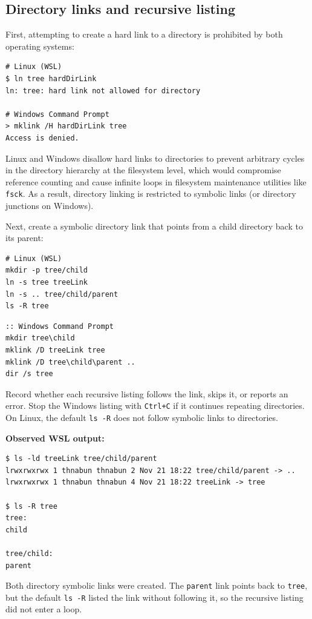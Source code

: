 \documentclass[a4paper,11pt]{article}
\begin{document}
\subsection{Directory links and recursive listing}
First, attempting to create a hard link to a directory is prohibited by both operating systems:
\begin{lstlisting}
# Linux (WSL)
$ ln tree hardDirLink
ln: tree: hard link not allowed for directory

# Windows Command Prompt
> mklink /H hardDirLink tree
Access is denied.
\end{lstlisting}
Linux and Windows disallow hard links to directories to prevent arbitrary cycles in the directory hierarchy at the filesystem level, which would compromise reference counting and cause infinite loops in filesystem maintenance utilities like \texttt{fsck}. As a result, directory linking is restricted to symbolic links (or directory junctions on Windows).

Next, create a symbolic directory link that points from a child directory back to its parent:
\begin{lstlisting}
# Linux (WSL)
mkdir -p tree/child
ln -s tree treeLink
ln -s .. tree/child/parent
ls -R tree
\end{lstlisting}
\begin{lstlisting}
:: Windows Command Prompt
mkdir tree\child
mklink /D treeLink tree
mklink /D tree\child\parent ..
dir /s tree
\end{lstlisting}

Record whether each recursive listing follows the link, skips it, or reports
an error. Stop the Windows listing with \texttt{Ctrl+C} if it continues
repeating directories. On Linux, the default \texttt{ls -R} does not follow
symbolic links to directories.

\noindent\textbf{Observed WSL output:}
\begin{lstlisting}
$ ls -ld treeLink tree/child/parent
lrwxrwxrwx 1 thnabun thnabun 2 Nov 21 18:22 tree/child/parent -> ..
lrwxrwxrwx 1 thnabun thnabun 4 Nov 21 18:22 treeLink -> tree

$ ls -R tree
tree:
child

tree/child:
parent
\end{lstlisting}

Both directory symbolic links were created. The \texttt{parent} link points
back to \texttt{tree}, but the default \texttt{ls -R} listed the link without
following it, so the recursive listing did not enter a loop.
\end{document}
